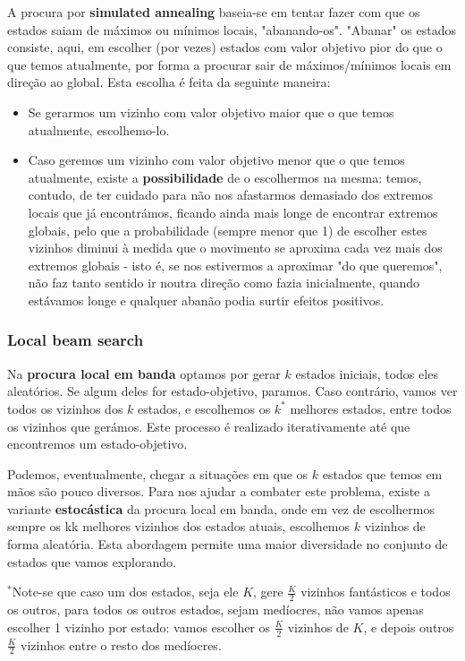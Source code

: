 \documentclass[11pt]{article}
\begin{document}
A procura por \textbf{simulated annealing} baseia-se em tentar fazer com que os estados saiam de máximos ou mínimos locais, "abanando-os". "Abanar" os estados consiste, aqui, em escolher (por vezes) estados com valor objetivo pior do que o que temos atualmente, por forma a procurar sair de máximos/mínimos locais em direção ao global. Esta escolha é feita da seguinte maneira:
\begin{itemize}
    \item Se gerarmos um vizinho com valor objetivo maior que o que temos atualmente, escolhemo-lo.
    \item Caso geremos um vizinho com valor objetivo menor que o que temos atualmente, existe a \textbf{possibilidade} de o escolhermos na mesma: temos, contudo, de ter cuidado para não nos afastarmos demasiado dos extremos locais que já encontrámos, ficando ainda mais longe de encontrar extremos globais, pelo que a probabilidade (sempre menor que 1) de escolher estes vizinhos diminui à medida que o movimento se aproxima cada vez mais dos extremos globais - isto é, se nos estivermos a aproximar "do que queremos", não faz tanto sentido ir noutra direção como fazia inicialmente, quando estávamos longe e qualquer abanão podia surtir efeitos positivos.
\end{itemize}

\subsubsection{Local beam search}

Na \textbf{procura local em banda} optamos por gerar $k$ estados iniciais, todos eles aleatórios. Se algum deles for estado-objetivo, paramos. Caso contrário, vamos ver todos os vizinhos dos $k$ estados, e escolhemos os $k^*$ melhores estados, entre todos os vizinhos que gerámos. Este processo é realizado iterativamente até que encontremos um estado-objetivo.\vspace{10pt}

Podemos, eventualmente, chegar a situações em que os $k$ estados que temos em mãos são pouco diversos. Para nos ajudar a combater este problema, existe a variante \textbf{estocástica} da procura local em banda, onde em vez de escolhermos sempre os kk melhores vizinhos dos estados atuais, escolhemos $k$ vizinhos de forma aleatória. Esta abordagem permite uma maior diversidade no conjunto de estados que vamos explorando.

$^*$Note-se que caso um dos estados, seja ele $K$, gere $\frac{K}{2}$ vizinhos fantásticos e todos os outros, para todos os outros estados, sejam medíocres, não vamos apenas escolher 1 vizinho por estado: vamos escolher os $\frac{K}{2}$ vizinhos de $K$, e depois outros $\frac{K}{2}$ vizinhos entre o resto dos medíocres.
\end{document}
